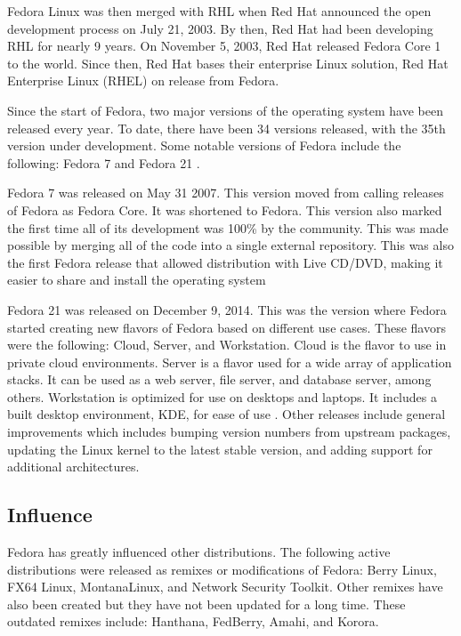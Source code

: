 \documentclass{article}
\begin{document}
Fedora Linux was then merged with RHL when Red Hat announced the open
development process on July 21, 2003. By then, Red Hat had been developing RHL
for nearly 9 years. On November 5, 2003, Red Hat released Fedora Core 1 to the
world. Since then, Red Hat bases their enterprise Linux solution, Red Hat
Enterprise Linux (RHEL) on release from Fedora.

Since the start of Fedora, two major versions of the operating system have been
released every year. To date, there have been 34 versions released, with the
35th version under development. Some notable versions of Fedora include the
following: Fedora 7 and Fedora 21 \parencite{redhat_history}.

Fedora 7 was released on May 31 2007. This version moved from calling releases
of Fedora as Fedora Core. It was shortened to Fedora. This version also marked
the first time all of its development was 100\% by the community. This was made
possible by merging all of the code into a single external repository. This was
also the first Fedora release that allowed distribution with Live CD/DVD, making
it easier to share and install the operating system \parencite{fedora_7}

Fedora 21 was released on December 9, 2014. This was the version where Fedora
started creating new flavors of Fedora based on different use cases. These
flavors were the following: Cloud, Server, and Workstation. Cloud is the flavor
to use in private cloud environments. Server is a flavor used for a wide array
of application stacks. It can be used as a web server, file server, and database
server, among others. Workstation is optimized for use on desktops and laptops.
It includes a built desktop environment, KDE, for ease of use
\parencite{fedora_21}. Other releases include general improvements which includes
bumping version numbers from upstream packages, updating the Linux kernel to the
latest stable version, and adding support for additional architectures.


\subsection{Influence}
Fedora has greatly influenced other distributions. The following active
distributions were released as remixes or modifications of Fedora: Berry Linux,
FX64 Linux, MontanaLinux, and Network Security Toolkit. Other remixes have also
been created but they have not been updated for a long time. These outdated
remixes include: Hanthana, FedBerry, Amahi, and Korora. \parencite{fedora_remix}
\end{document}
